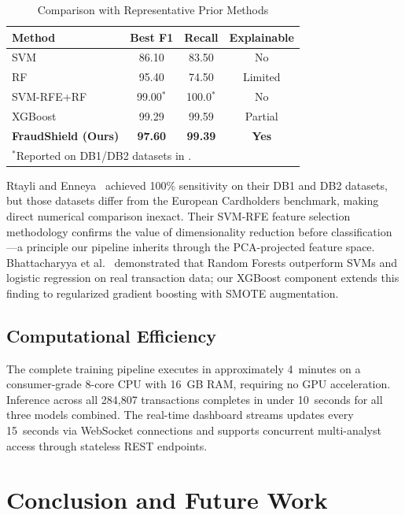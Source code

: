 \documentclass[conference,10pt]{IEEEtran}
\begin{document}
\begin{table}[t]
\centering
\caption{Comparison with Representative Prior Methods}
\label{tab:comparison}
\begin{tabular}{@{}lccc@{}}
\toprule
\textbf{Method} & \textbf{Best F1} & \textbf{Recall} & \textbf{Explainable} \\
\midrule
SVM~\cite{bhattacharyya2011data} & 86.10 & 83.50 & No \\
RF~\cite{bhattacharyya2011data} & 95.40 & 74.50 & Limited \\
SVM-RFE+RF~\cite{rtayli2020enhanced} & 99.00$^{*}$ & 100.0$^{*}$ & No \\
XGBoost~\cite{chen2016xgboost} & 99.29 & 99.59 & Partial \\
\midrule
\textbf{FraudShield (Ours)} & \textbf{97.60} & \textbf{99.39} & \textbf{Yes} \\
\bottomrule
\multicolumn{4}{l}{\small $^{*}$Reported on DB1/DB2 datasets in \cite{rtayli2020enhanced}.}
\end{tabular}
\end{table}

Rtayli and Enneya~\cite{rtayli2020enhanced} achieved 100\% sensitivity on their DB1 and DB2 datasets, but those datasets differ from the European Cardholders benchmark, making direct numerical comparison inexact. Their SVM-RFE feature selection methodology confirms the value of dimensionality reduction before classification---a principle our pipeline inherits through the PCA-projected feature space. Bhattacharyya et al.~\cite{bhattacharyya2011data} demonstrated that Random Forests outperform SVMs and logistic regression on real transaction data; our XGBoost component extends this finding to regularized gradient boosting with SMOTE augmentation.

\subsection{Computational Efficiency}
The complete training pipeline executes in approximately 4~minutes on a consumer-grade 8-core CPU with 16~GB RAM, requiring no GPU acceleration. Inference across all 284,807 transactions completes in under 10~seconds for all three models combined. The real-time dashboard streams updates every 15~seconds via WebSocket connections and supports concurrent multi-analyst access through stateless REST endpoints.

\section{Conclusion and Future Work}
\end{document}
